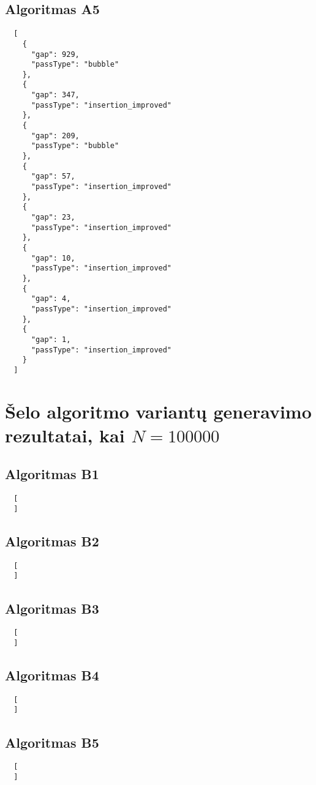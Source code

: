 \documentclass{VUMIFInfKursinis}
\begin{document}
\subsection{Algoritmas A5}

\lstset{language=json}
\begin{lstlisting}
  [
    {
      "gap": 929,
      "passType": "bubble"
    },
    {
      "gap": 347,
      "passType": "insertion_improved"
    },
    {
      "gap": 209,
      "passType": "bubble"
    },
    {
      "gap": 57,
      "passType": "insertion_improved"
    },
    {
      "gap": 23,
      "passType": "insertion_improved"
    },
    {
      "gap": 10,
      "passType": "insertion_improved"
    },
    {
      "gap": 4,
      "passType": "insertion_improved"
    },
    {
      "gap": 1,
      "passType": "insertion_improved"
    }
  ]
\end{lstlisting}


\section{Šelo algoritmo variantų generavimo rezultatai, kai $N = 100000$}

\subsection{Algoritmas B1}

\lstset{language=json}
\begin{lstlisting}
  [
  ]
\end{lstlisting}


\subsection{Algoritmas B2}

\lstset{language=json}
\begin{lstlisting}
  [
  ]
\end{lstlisting}


\subsection{Algoritmas B3}

\lstset{language=json}
\begin{lstlisting}
  [
  ]
\end{lstlisting}


\subsection{Algoritmas B4}

\lstset{language=json}
\begin{lstlisting}
  [
  ]
\end{lstlisting}


\subsection{Algoritmas B5}

\lstset{language=json}
\begin{lstlisting}
  [
  ]
\end{lstlisting}
\end{document}
